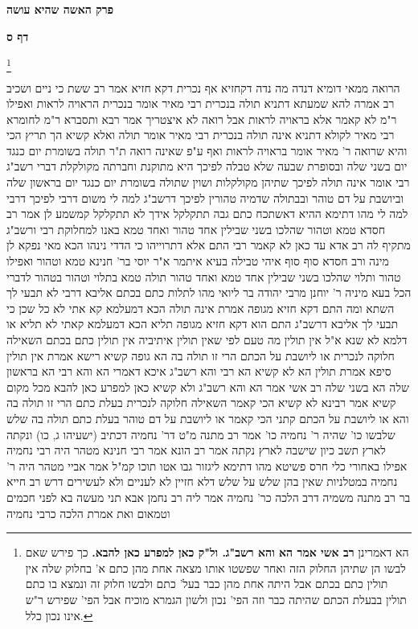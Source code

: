 \documentclass[12pt, openany]{book}
\newcommand{\sethebfont}{
\fontsize{10.5pt}{21.0pt} \selectfont
}
\newcommand{\twocol}[1]{
	{\sethebfont \begin{multicols}{2}
			#1
	\end{multicols}}	
}
\newcommand{\chapname}{}
\newcommand{\sectname}{}
\newcommand{\newchap}[1]{
	\addcontentsline{toc}{chapter}{#1}
	\renewcommand{\chapname}{#1}
		\begin{center}
			\textbf{%
\fontsize{16pt}{16pt}\selectfont
				#1}
		\end{center}
}
\newcommand{\newsection}[1]{
	\addcontentsline{toc}{section}{#1}
	\renewcommand{\sectname}{#1}	
	\vspace{-\baselineskip}
	\begin{center}
		\textbf{%
\fontsize{16pt}{16pt}\selectfont
			#1}
	\end{center}
	\vspace{-\baselineskip}
	\nopagebreak
}
\newcommand{\footnotecomment}[1]{\footnote{#1}}
\newcommand{\commenta}[1]{\footnotecomment{#1}}
\begin{document}
\newchap{פרק  האשה שהיא עושה}

\newsection{דף ס}
\twocol{
\commenta{ הא דאמרינן \textbf{רב אשי אמר הא והא רשב"ג. ול"ק כאן למפרע כאן להבא.}  כך פירש שאם לבשו הן שתיהן החלוק הזה ואחר שפשטו אותו מצאה אחת מהן כתם א' בחלוק שלה אין תולין כתם בכתם אבל היתה אחת מהן כבר בעל' כתם ולבשו חלוק זה ונמצא בו כתם תולין בבעלת הכתם שהיתה כבר וזה הפי' נכון ולשון הגמרא מוכיח אבל הפי' שפירש ר"ש אינו נכון כלל. }

הרואה 
ממאי  דומיא דנדה מה נדה דקחזיא אף נכרית דקא חזיא 
אמר רב ששת  כי ניים ושכיב רב אמרה להא שמעתא  דתניא  תולה בנכרית  רבי מאיר אומר  בנכרית הראויה לראות  ואפילו ר"מ לא קאמר אלא בראויה לראות אבל רואה לא איצטריך 
אמר רבא  ותסברא ר"מ לחומרא  רבי מאיר לקולא 
דתניא  אינה תולה בנכרית  רבי מאיר אומר  תולה  ואלא קשיא הך  תריץ הכי  והיא שרואה  ר' מאיר אומר בראויה לראות ואף ע"פ שאינה רואה 
ת"ר  תולה בשומרת יום כנגד יום בשני שלה
ובסופרת שבעה שלא טבלה  לפיכך היא מתוקנת  וחברתה מקולקלת דברי רשב"ג  רבי אומר  אינה תולה לפיכך שתיהן מקולקלות 
ושוין שתולה בשומרת יום כנגד יום בראשון שלה
וביושבת על דם טוהר ובבתולה שדמיה טהורין 
לפיכך דרשב"ג למה לי  משום דרבי 
לפיכך דרבי למה לי  מהו דתימא  ההיא דאשתכח כתם גבה תתקלקל אידך לא תתקלקל קמשמע לן 
אמר רב חסדא  טמא וטהור שהלכו בשני שבילין אחד טהור ואחד טמא באנו למחלוקת רבי ורשב"ג 
מתקיף לה רב אדא  עד כאן לא קאמר רבי התם אלא דתרוייהו כי הדדי נינהו הכא מאי נפקא לן מינה 
ורב חסדא סוף סוף איהי טבילה בעיא 
איתמר א"ר יוסי בר' חנינא  טמא וטהור ואפילו טהור ותלוי שהלכו בשני שבילין אחד טמא ואחד טהור תולה טמא בתלוי וטהור בטהור לדברי הכל 
בעא מיניה ר' יוחנן מרבי יהודה בר ליואי  מהו לתלות כתם בכתם  אליבא דרבי לא תבעי לך
השתא ומה התם דקא חזיא מגופה אמרת אינה תולה הכא דמעלמא קא אתי לא כל שכן 
כי תבעי לך אליבא דרשב"ג התם הוא דקא חזיא מגופה תליא הכא דמעלמא קאתי לא תליא או דלמא לא שנא 
א"ל  אין תולין  מה טעם  לפי שאין תולין 
איתיביה  אין תולין כתם בכתם  השאילה חלוקה לנכרית או ליושבת על הכתם הרי זו תולה בה 
הא גופה קשיא  רישא אמרת אין תולין סיפא אמרת תולין  הא לא קשיא הא רבי והא רשב"ג 
איכא דאמרי  הא והא רבי הא בראשון שלה הא בשני שלה 
רב אשי אמר  הא והא רשב"ג ולא קשיא
כאן למפרע כאן להבא 
מכל מקום קשיא  אמר רבינא  לא קשיא הכי קאמר  השאילה חלוקה לנכרית בעלת כתם הרי זו תולה בה
והא או ליושבת על הכתם קתני  הכי קאמר  או ליושבת על דם טוהר בעלת כתם תולה בה
שלש שלבשו כו' שהיה ר' נחמיה כו' אמר רב מתנה  מ"ט דר' נחמיה דכתיב (ישעיהו ג, כו) ונקתה לארץ תשב כיון שישבה לארץ נקתה 
אמר רב הונא אמר רבי חנינא  מטהר היה רבי נחמיה אפילו באחורי כלי חרס  פשיטא 
מהו דתימא  ליגזור גבו אטו תוכו קמ"ל 
אמר אביי  מטהר היה ר' נחמיה במטלניות שאין בהן שלש על שלש דלא חזיין לא לעניים ולא לעשירים 
דרש רב חייא בר רב מתנה משמיה דרב  הלכה כר' נחמיה  אמר ליה רב נחמן  אבא תני מעשה בא לפני חכמים וטמאום ואת אמרת הלכה כרבי נחמיה 
}
\end{document}
